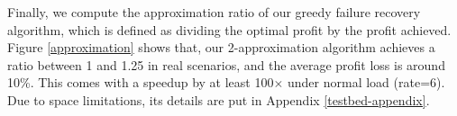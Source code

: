 \documentclass[sigconf]{acmart}
\begin{document}
Finally, we compute the approximation ratio of our greedy failure recovery algorithm, 
which is defined as dividing the optimal profit by the profit achieved. 
Figure \ref{approximation} shows that, 
our 2-approximation algorithm achieves a ratio between 1 and 1.25 in real scenarios, 
and the average profit loss is around 10\%. 
This comes with a speedup by at least 100$\times$ under normal load (rate=6). 
Due to space limitations, its details are put in Appendix \ref{testbed-appendix}.
\end{document}
